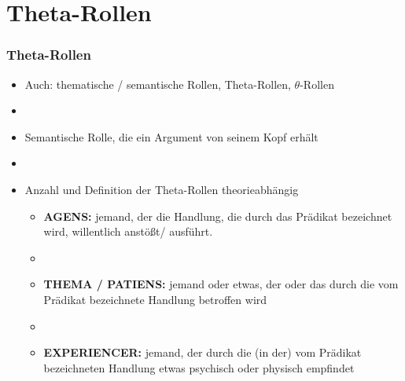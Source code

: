 \section{Theta-Rollen}

\begin{frame}
\frametitle{Theta-Rollen}

\begin{itemize}
	\item Auch: thematische / semantische Rollen, Theta-Rollen, $\theta$-Rollen
	\item[]
	\item Semantische Rolle, die ein Argument von seinem Kopf erhält
	\item[]
	\item Anzahl und Definition der Theta-Rollen \ras theorieabhängig

	\begin{itemize}
		\item \textbf{AGENS:} jemand, der die Handlung, die durch das Prädikat bezeichnet wird, willentlich anstößt/ ausführt.
		\item[]
		\item \textbf{THEMA / PATIENS:} jemand oder etwas, der oder das durch die vom Prädikat bezeichnete Handlung betroffen wird
		\item[]
		\item \textbf{EXPERIENCER:} jemand, der durch die (in der) vom Prädikat bezeichneten Handlung etwas psychisch oder physisch empfindet

	\end{itemize}

\end{itemize}

\end{frame}


